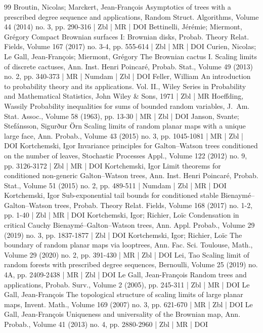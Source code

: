 \documentclass[10pt]{amsart}
\theoremstyle{definition}\newtheorem{defi}[theo]{Definition}\newtheorem{rema}[theo]{Remark}\newtheorem{exam}[theo]{Example}\newtheorem{exem}[theo]{Example}\newtheorem{nota}[theo]{Notation}
\newcommand{\1}{\ensembles{1}}
\providecommand{\?}{}
\begin{document}
\begin{thebibliography}{99}
Broutin, Nicolas; Marckert, Jean-François Asymptotics of trees with a prescribed degree sequence and applications, Random Struct. Algorithms, Volume 44 (2014) no. 3, pp. 290-316 | Zbl | MR | DOI
Bettinelli, Jérémie; Miermont, Grégory Compact Brownian surfaces I: Brownian disks, Probab. Theory Relat. Fields, Volume 167 (2017) no. 3-4, pp. 555-614 | Zbl | MR | DOI
Curien, Nicolas; Le Gall, Jean-François; Miermont, Grégory The Brownian cactus I. Scaling limits of discrete cactuses, Ann. Inst. Henri Poincaré, Probab. Stat., Volume 49 (2013) no. 2, pp. 340-373 | MR | Numdam | Zbl | DOI
Feller, William An introduction to probability theory and its applications. Vol. II., Wiley Series in Probability and Mathematical Statistics, John Wiley \& Sons, 1971 | Zbl | MR
Hoeffding, Wassily Probability inequalities for sums of bounded random variables, J. Am. Stat. Assoc., Volume 58 (1963), pp. 13-30 | MR | Zbl | DOI
Janson, Svante; Stefánsson, Sigurður Örn Scaling limits of random planar maps with a unique large face, Ann. Probab., Volume 43 (2015) no. 3, pp. 1045-1081 | MR | Zbl | DOI
Kortchemski, Igor Invariance principles for Galton–Watson trees conditioned on the number of leaves, Stochastic Processes Appl., Volume 122 (2012) no. 9, pp. 3126-3172 | Zbl | MR | DOI
Kortchemski, Igor Limit theorems for conditioned non-generic Galton–Watson trees, Ann. Inst. Henri Poincaré, Probab. Stat., Volume 51 (2015) no. 2, pp. 489-511 | Numdam | Zbl | MR | DOI
Kortchemski, Igor Sub-exponential tail bounds for conditioned stable Bienaymé–Galton–Watson trees, Probab. Theory Relat. Fields, Volume 168 (2017) no. 1-2, pp. 1-40 | Zbl | MR | DOI
Kortchemski, Igor; Richier, Loïc Condensation in critical Cauchy Bienaymé–Galton–Watson trees, Ann. Appl. Probab., Volume 29 (2019) no. 3, pp. 1837-1877 | Zbl | DOI
Kortchemski, Igor; Richier, Loïc The boundary of random planar maps via looptrees, Ann. Fac. Sci. Toulouse, Math., Volume 29 (2020) no. 2, pp. 391-430 | MR | Zbl | DOI
Lei, Tao Scaling limit of random forests with prescribed degree sequences, Bernoulli, Volume 25 (2019) no. 4A, pp. 2409-2438 | MR | Zbl | DOI
Le Gall, Jean-François Random trees and applications, Probab. Surv., Volume 2 (2005), pp. 245-311 | Zbl | MR | DOI
Le Gall, Jean-François The topological structure of scaling limits of large planar maps, Invent. Math., Volume 169 (2007) no. 3, pp. 621-670 | MR | Zbl | DOI
Le Gall, Jean-François Uniqueness and universality of the Brownian map, Ann. Probab., Volume 41 (2013) no. 4, pp. 2880-2960 | Zbl | MR | DOI

\end{thebibliography}
\end{document}
